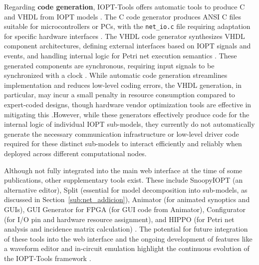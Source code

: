 Regarding \textbf{code generation}, IOPT-Tools offers automatic tools to produce C and VHDL from IOPT models \cite{manual, vhld}. The C code generator produces ANSI C files suitable for microcontrollers or PCs, with the \texttt{net\_io.c} file requiring adaptation for specific hardware interfaces \cite{manual}. The VHDL code generator synthesizes VHDL component architectures, defining external interfaces based on IOPT signals and events, and handling internal logic for Petri net execution semantics \cite{vhld}. These generated components are synchronous, requiring input signals to be synchronized with a clock \cite{vhld}. While automatic code generation streamlines implementation and reduces low-level coding errors, the VHDL generation, in particular, may incur a small penalty in resource consumption compared to expert-coded designs, though hardware vendor optimization tools are effective in mitigating this \cite{vhld}.However, while these generators effectively produce code for the internal logic of individual IOPT sub-models, they currently do not automatically generate the necessary communication infrastructure or low-level driver code required for these distinct sub-models to interact efficiently and reliably when deployed across different computational nodes.

Although not fully integrated into the main web interface at the time of some publications, other supplementary tools exist. These include SnoopyIOPT (an alternative editor), Split (essential for model decomposition into sub-models, as discussed in Section~\ref{sub:net_addicion}), Animator (for animated synoptics and GUIs), GUI Generator for FPGA (for GUI code from Animator), Configurator (for I/O pin and hardware resource assignment), and HIPPO (for Petri net analysis and incidence matrix calculation) \cite{manual}. The potential for future integration of these tools into the web interface and the ongoing development of features like a waveform editor and in-circuit emulation highlight the continuous evolution of the IOPT-Tools framework \cite{2015gomes, manual}.





